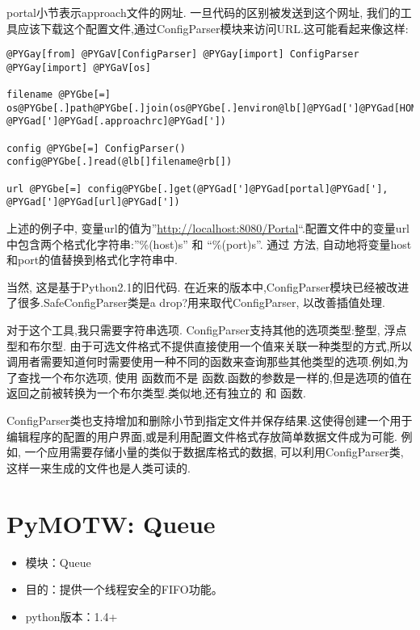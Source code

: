 \documentclass[a4paper,10pt,english]{manual}
\begin{document}
portal小节表示approach文件的网址. 一旦代码的区别被发送到这个网址, 我们的工具应该下载这个配置文件,通过ConfigParser模块来访问URL.这可能看起来像这样:

\begin{Verbatim}[commandchars=@\[\]]
@PYGay[from] @PYGaV[ConfigParser] @PYGay[import] ConfigParser
@PYGay[import] @PYGaV[os]

filename @PYGbe[=] os@PYGbe[.]path@PYGbe[.]join(os@PYGbe[.]environ@lb[]@PYGad[']@PYGad[HOME]@PYGad[']@rb[], @PYGad[']@PYGad[.approachrc]@PYGad['])

config @PYGbe[=] ConfigParser()
config@PYGbe[.]read(@lb[]filename@rb[])

url @PYGbe[=] config@PYGbe[.]get(@PYGad[']@PYGad[portal]@PYGad['], @PYGad[']@PYGad[url]@PYGad['])
\end{Verbatim}

上述的例子中, 变量url的值为''\href{http://localhost:8080/Portal}{http://localhost:8080/Portal}``.配置文件中的变量url中包含两个格式化字符串:''\%(host)s'' 和 ``\%(port)s''. 通过  方法, 自动地将变量host和port的值替换到格式化字符串中.

当然, 这是基于Python2.1的旧代码. 在近来的版本中,ConfigParser模块已经被改进了很多.SafeConfigParser类是a drop?用来取代ConfigParser, 以改善插值处理.

对于这个工具,我只需要字符串选项. ConfigParser支持其他的选项类型:整型, 浮点型和布尔型. 由于可选文件格式不提供直接使用一个值来关联一种类型的方式,所以调用者需要知道何时需要使用一种不同的函数来查询那些其他类型的选项.例如,为了查找一个布尔选项, 使用  函数而不是  函数.函数的参数是一样的,但是选项的值在返回之前被转换为一个布尔类型.类似地,还有独立的  和  函数.

ConfigParser类也支持增加和删除小节到指定文件并保存结果.这使得创建一个用于编辑程序的配置的用户界面,或是利用配置文件格式存放简单数据文件成为可能. 例如, 一个应用需要存储小量的类似于数据库格式的数据, 可以利用ConfigParser类,这样一来生成的文件也是人类可读的.

\resetcurrentobjects


\chapter{PyMOTW: Queue}
\begin{itemize}
\item {} 
模块：Queue

\item {} 
目的：提供一个线程安全的FIFO功能。

\item {} 
python版本：1.4+

\end{itemize}
\end{document}
